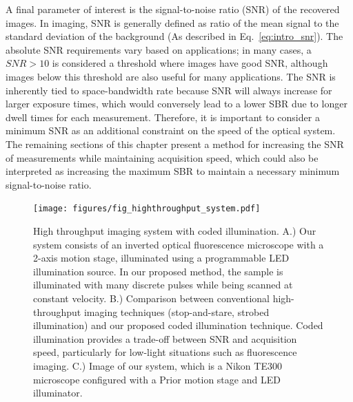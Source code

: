 A final parameter of interest is the signal-to-noise ratio (SNR) of the recovered images. In imaging, SNR is generally defined as ratio of the mean signal to the standard deviation of the background (As described in Eq.~\ref{eq:intro_snr}). The absolute SNR requirements vary based on applications; in many cases, a $SNR > 10$ is considered a threshold where images have good SNR, although images below this threshold are also useful for many applications. The SNR is inherently tied to space-bandwidth rate because SNR will always increase for larger exposure times, which would conversely lead to a lower SBR due to longer dwell times for each measurement. Therefore, it is important to consider a minimum SNR as an additional constraint on the speed of the optical system. The remaining sections of this chapter present a method for increasing the SNR of measurements while maintaining acquisition speed, which could also be interpreted as increasing the maximum SBR to maintain a necessary minimum signal-to-noise ratio.

\begin{figure}
  \centering
    \texttt{[image: figures/fig\_highthroughput\_system.pdf]}
  \caption{\label{fig:system}High throughput imaging system with coded illumination. A.) Our system consists of an inverted optical fluorescence microscope with a 2-axis motion stage, illuminated using a programmable LED illumination source. In our proposed method, the sample is illuminated with many discrete pulses while being scanned at constant velocity. B.) Comparison between conventional high-throughput imaging techniques (stop-and-stare, strobed illumination) and our proposed coded illumination technique. Coded illumination provides a trade-off between SNR and acquisition speed, particularly for low-light situations such as fluorescence imaging. C.) Image of our system, which is a Nikon TE300 microscope configured with a Prior motion stage and LED illuminator.}

\end{figure}

